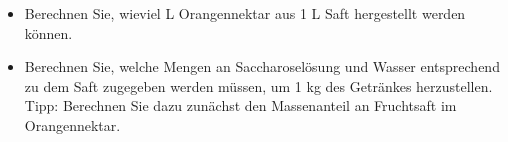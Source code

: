\documentclass[a4paper,11pt]{article}
\newif\ifshowme
\begin{document}
\begin{itemize}


\item Berechnen Sie, wieviel L Orangennektar aus 1 L Saft hergestellt werden können.
\ifshowme
\antwort{
\begin{align*}
\frac{9~\text{g}}{\text{L}} \cdot 1 \text{L} &= \frac{5~\text{g}}{\text{L}} \cdot x  \\
x &= \frac{9~\text{g}}{\text{L}} \cdot \frac{\text{L}}{5~\text{g}} \\
x &= \frac{9}{5} = 1,8~\text{L}
\end{align*}

}
\else
\fi





\pp
\item Berechnen Sie, welche Mengen an Saccharoselösung und Wasser entsprechend zu dem
Saft zugegeben werden müssen, um 1 kg des Getränkes herzustellen. Tipp: Berechnen Sie
dazu zunächst den Massenanteil an Fruchtsaft im Orangennektar.
\ifshowme
\antwort{
\begin{align*}
m_1 &= 1,8 ~\text{L} \cdot 1,0299 ~\text{kg/L} = 1,854 ~\text{kg} \\
m_2 &= 1 ~\text{L} \cdot 1,0465 ~\text{kg/L} = 1,0465 ~\text{kg} \\ 
&\rightarrow \frac{1,0465 ~\text{kg}}{1,854 ~\text{kg}} =  0,5644 ~\text{kg}
\end{align*}
Um 1 Kg Nektar herstellen zu können benötigen wir 0,5644 kg Saft. \par 
Menge Zucker aus Saft berechnen:
\begin{align*}
0,5644 ~\text{kg} \cdot 0,12 = 0,068 ~\text{kg}
\end{align*}
Da wir 1 kg $\cdot $ 8° Brix = 0,08 kg Zucker in unserem Nektar benötigen, fehlen noch:
\begin{align*}
0,08~\text{kg} - 0,068~\text{kg} = 0,012 ~\text{kg}
\end{align*}
Dafür benötigen wir folgende Menge 65\% Saccharose-Lösung:
\begin{align*}
\frac{0,012~\text{kg}}{0,65} = 0,0185 ~\text{kg}
\end{align*}
Und der Rest ist Wasser:
\begin{align*}
(1-0,5644-0,0185)~\text{kg} = 0,4171 ~\text{kg}
\end{align*}
}
\else
\fi



\end{itemize}
\end{document}
